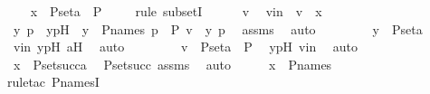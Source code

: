\begin{isabellebody}
\ \ \isamarkupfalse%
\ {\isachardoublequoteopen}x\ {\isasymsubseteq}\ P{\isacharunderscore}{\kern0pt}set{\isacharparenleft}{\kern0pt}a{\isacharparenright}{\kern0pt}\ {\isasymtimes}\ P{\isachardoublequoteclose}\ \isanewline
\ \ \isamarkupfalse%
\ {\isacharparenleft}{\kern0pt}rule\ subsetI{\isacharparenright}{\kern0pt}\isanewline
\ \ \ \ \isamarkupfalse%
\ v\ \isamarkupfalse%
\ vin\ {\isacharcolon}{\kern0pt}\ {\isachardoublequoteopen}v\ {\isasymin}\ x{\isachardoublequoteclose}\ \isanewline
\ \ \ \ \isamarkupfalse%
\ \isamarkupfalse%
\ y\ p\ \ ypH\ {\isacharcolon}{\kern0pt}\ {\isachardoublequoteopen}y\ {\isasymin}\ P{\isacharunderscore}{\kern0pt}names{\isachardoublequoteclose}\ {\isachardoublequoteopen}p\ {\isasymin}\ P{\isachardoublequoteclose}\ {\isachardoublequoteopen}v\ {\isacharequal}{\kern0pt}\ {\isacharless}{\kern0pt}y{\isacharcomma}{\kern0pt}\ p{\isachargreater}{\kern0pt}{\isachardoublequoteclose}\ \isamarkupfalse%
\ assms\ \isamarkupfalse%
\ auto\ \isanewline
\ \ \ \ \isamarkupfalse%
\ \isamarkupfalse%
\ {\isachardoublequoteopen}y\ {\isasymin}\ P{\isacharunderscore}{\kern0pt}set{\isacharparenleft}{\kern0pt}a{\isacharparenright}{\kern0pt}{\isachardoublequoteclose}\ \isamarkupfalse%
\ vin\ ypH\ aH\ \isamarkupfalse%
\ auto\ \isanewline
\ \ \ \ \isamarkupfalse%
\ \isamarkupfalse%
\ {\isachardoublequoteopen}v\ {\isasymin}\ P{\isacharunderscore}{\kern0pt}set{\isacharparenleft}{\kern0pt}a{\isacharparenright}{\kern0pt}\ {\isasymtimes}\ P{\isachardoublequoteclose}\ \isamarkupfalse%
\ ypH\ vin\ \isamarkupfalse%
\ auto\isanewline
\ \ \isamarkupfalse%
\isanewline
\ \ \isamarkupfalse%
\ \isamarkupfalse%
\ {\isachardoublequoteopen}x\ {\isasymin}\ P{\isacharunderscore}{\kern0pt}set{\isacharparenleft}{\kern0pt}succ{\isacharparenleft}{\kern0pt}a{\isacharparenright}{\kern0pt}{\isacharparenright}{\kern0pt}{\isachardoublequoteclose}\ \isamarkupfalse%
\ P{\isacharunderscore}{\kern0pt}set{\isacharunderscore}{\kern0pt}succ\ assms\ \isamarkupfalse%
\ auto\isanewline
\ \ \isamarkupfalse%
\ \isamarkupfalse%
\ {\isachardoublequoteopen}x\ {\isasymin}\ P{\isacharunderscore}{\kern0pt}names{\isachardoublequoteclose}\ \isanewline
\ \ \ \ \isamarkupfalse%
{\isacharparenleft}{\kern0pt}rule{\isacharunderscore}{\kern0pt}tac\ P{\isacharunderscore}{\kern0pt}namesI{\isacharparenright}{\kern0pt}\isanewline

\end{isabellebody}
